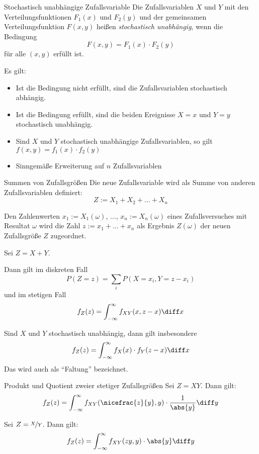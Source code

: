\begin{defi}{Stochastisch unabhängige Zufallsvariable}
    Die Zufallsvariablen $X$ und $Y$ mit den Verteilungsfunktionen $F_1(x)$ und $F_2(y)$ und der gemeinsamen Verteilungsfunktion $F(x,y)$ heißen \emph{stochastisch unabhängig}, wenn die Bedingung
    \[
        F(x,y) = F_1(x) \cdot F_2(y)
    \]
    für alle $(x,y)$ erfüllt ist.

    Es gilt:
    \begin{itemize}
        \item Ist die Bedingung nicht erfüllt, sind die Zufallsvariablen stochastisch abhängig.
        \item Ist die Bedingung erfüllt, sind die beiden Ereignisse $X = x$ und $Y = y$ stochastisch unabhängig.
        \item Sind $X$ und $Y$ stochastisch unabhängige Zufallsvariablen, so gilt $f(x,y) = f_1(x) \cdot f_2(y)$
        \item Sinngemäße Erweiterung auf $n$ Zufallsvariablen
    \end{itemize}
\end{defi}

\begin{algo}{Summen von Zufallsgrößen}
    Die neue Zufallsvariable wird als Summe von anderen Zufallsvariablen definiert:
    \[
        Z := X_1 + X_2 + \ldots + X_n
    \]

    Den Zahlenwerten $x_1 := X_1(\omega)$, $\ldots$, $x_n := X_n(\omega)$ eines Zufallsversuches mit Resultat $\omega$ wird die Zahl $z := x_1 + \ldots + x_n$ als Ergebnis $Z(\omega)$ der neuen Zufallsgröße $Z$ zugeordnet.

    Sei $Z = X + Y$.

    Dann gilt im diskreten Fall
    \[
        P(Z = z) = \sum_i P(X = x_i, Y = z - x_i)
    \]
    und im stetigen Fall
    \[
        f_Z(z) = \int_{-\infty}^{\infty} f_{XY}(x,z-x) \diff x
    \]

    Sind $X$ und $Y$ stochastisch unabhängig, dann gilt insbesondere
    \[
        f_Z(z) = \int_{-\infty}^{\infty} f_X(x) \cdot f_Y(z-x) \diff x
    \]
    Das wird auch als \enquote{Faltung} bezeichnet.
\end{algo}

\begin{algo}{Produkt und Quotient zweier stetiger Zufallsgrößen}
    Sei $Z = XY$.
    Dann gilt:
    \[
        f_Z(z) = \int_{-\infty}^{\infty} f_{XY}(\nicefrac{z}{y}, y) \cdot \frac{1}{\abs{y}} \diff y
    \]

    Sei $Z = \nicefrac{X}{Y}$.
    Dann gilt:
    \[
        f_Z(z) = \int_{-\infty}^{\infty} f_{XY}(zy,y) \cdot \abs{y} \diff y
    \]
\end{algo}

